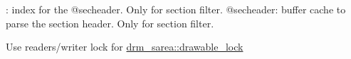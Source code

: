 
\begin{DoxyRefList}
\item[Class \mbox{\hyperlink{structdmxdev__filter}{dmxdev\+\_\+filter}} ]\label{todo__todo000001}%
%
\+: index for the @secheader. Only for section filter. @secheader\+: buffer cache to parse the section header. Only for section filter.  
\item[Member \mbox{\hyperlink{structdrm__sarea_a89ed0ff583f17e4823cd26d1c09c164e}{drm\+\_\+sarea::drawable\+\_\+lock}} ]\label{todo__todo000002}%
%
Use readers/writer lock for \mbox{\hyperlink{structdrm__sarea_a89ed0ff583f17e4823cd26d1c09c164e}{drm\+\_\+sarea\+::drawable\+\_\+lock}} 
\end{DoxyRefList}